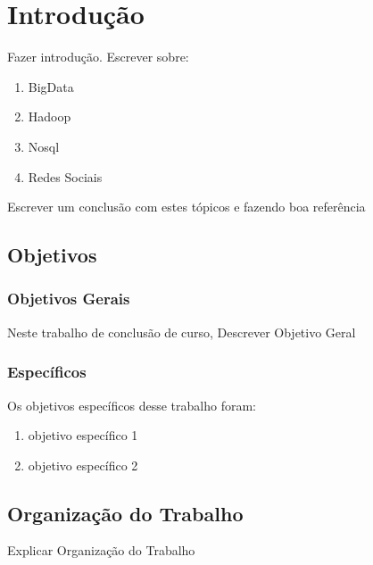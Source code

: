 \chapter{Introdução}
 
Fazer introdução. Escrever sobre:

\begin{enumerate}
  \item BigData
  \item Hadoop
  \item Nosql
  \item Redes Sociais
\end{enumerate}

Escrever um conclusão com estes tópicos e fazendo boa referência

 
\section{Objetivos}

\subsection{Objetivos Gerais}
 
Neste trabalho de conclusão de curso, Descrever Objetivo Geral
 
 
 
\subsection{Específicos}
 
Os objetivos específicos desse trabalho foram:
 
\begin{enumerate}
  \item objetivo específico 1
  \item objetivo específico 2 
\end{enumerate}
 
 
\section{Organização do Trabalho}
 
Explicar Organização do Trabalho
